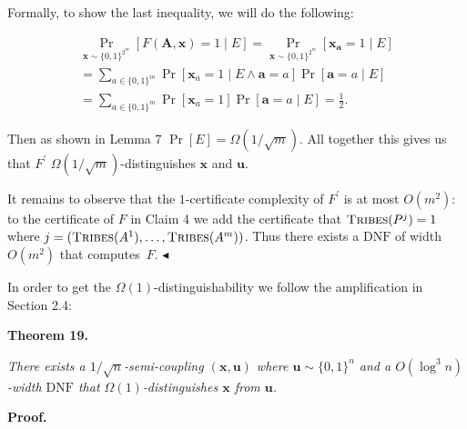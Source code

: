 Formally, to show the last inequality, we will do the following:\par


\[\begin{gathered}
\displaystyle\Pr_{\bm{x}\sim\{0,1\}^{2^{m}}}[F(\bm{A},\bm{x})=1\mid E] \displaystyle=\Pr_{\bm{x}\sim\{0,1\}^{2^{m}}}[\bm{x}_{\bm{a}}=1\mid E] \\
\displaystyle=\sum_{a\in\{0,1\}^{m}}\Pr[\bm{x}_{a}=1\mid E\land\bm{a}=a]\Pr[\bm{a}=a\mid E] \\
\displaystyle=\sum_{a\in\{0,1\}^{m}}\Pr[\bm{x}_{a}=1]\Pr[\bm{a}=a\mid E]=\frac{1}{2}.
\end{gathered}\]


Then as shown in Lemma 7 $\Pr[E]=\Omega(1/\sqrt{m})$. All together this gives us that $F^{\prime}$ $\Omega(1/\sqrt{m})$-distinguishes $\bm{x}$ and $\bm{u}$.\par




It remains to observe that the $1$-certificate complexity of $F^{\prime}$ is at most $O(m^{2})$: to the certificate of $F$ in Claim 4 we add the certificate that $\textsc{Tribes}(P^{j})=1$ where $j=(\textsc{Tribes}(A^{1}),\dots,\textsc{Tribes}(A^{m}))$. Thus there exists a $\mathrm{DNF}$ of width $O(m^{2})$ that computes $F$.
$\blacktriangleleft$\par




In order to get the $\Omega(1)$-distinguishability we follow the amplification in Section 2.4:\par





\par\medskip\noindent\textbf{
\textbf{Theorem 19}\textbf{.}
}\par



\emph{There exists a $1/\sqrt{n}$-semi-coupling $(\bm{x},\bm{u})$ where $\bm{u}\sim\{0,1\}^{n}$ and a $O(\log^{3}n)$-width $\mathrm{DNF}$ that $\Omega(1)$-distinguishes $\bm{x}$ from $\bm{u}$.}\par







\par\medskip\noindent\textbf{Proof.}\par




